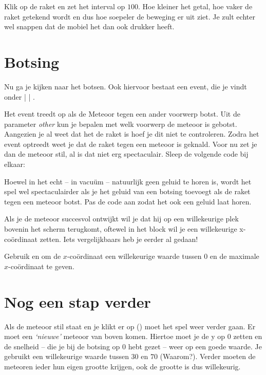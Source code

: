 \begin{opgave}
	\opgVraag
	Klik op de raket en zet het interval op $100$. Hoe kleiner het getal, hoe vaker de raket getekend wordt en dus hoe soepeler de beweging er uit ziet. Je zult echter wel snappen dat de mobiel het dan ook drukker heeft. 
\end{opgave}
\runOpTelefoon[-1.2in]{}

\section{Botsing}	
Nu ga je kijken naar het botsen. Ook hiervoor bestaat een event, die je vindt onder  |  | .

Het event treedt op als de Meteoor tegen een ander voorwerp botst. Uit de parameter \emph{other} kun je bepalen met welk voorwerp de meteoor is gebotst. Aangezien je al weet dat het de raket is hoef je dit niet te controleren. Zodra het event optreedt weet je dat de raket tegen een meteoor is geknald. Voor nu zet je dan de meteoor stil, al is dat niet erg spectaculair. Sleep de volgende code bij elkaar:


\runOpTelefoon{}
\begin{opgave}
   \opgVraag
	Hoewel in het echt -- in vacu\"um -- natuurlijk geen geluid te horen is, wordt het spel wel spectaculairder als je het geluid van een botsing toevoegt als de raket tegen een meteoor botst. Pas de code aan zodat het ook een geluid laat horen.
\end{opgave}

Als je de meteoor succesvol ontwijkt wil je dat hij op een willekeurige plek bovenin het scherm terugkomt, oftewel in het  block wil je een willekeurige x-co\"ordinaat zetten. Iets vergelijkbaars heb je eerder al gedaan!

\begin{opgave}
	\opgVraag
	Gebruik  en  om de $x$-co\"ordinaat een willekeurige waarde tussen 0 en de maximale $x$-co\"ordinaat te geven. 
\end{opgave}

\section{Nog een stap verder}
Als \runOpTelefoon{}de meteoor stil staat en je klikt er op () moet het spel weer verder gaan. Er moet een \emph{`nieuwe'} meteoor van boven komen. Hiertoe moet je de y op $0$ zetten en de snelheid -- die je bij de botsing op $0$  hebt gezet -- weer op een goede waarde. Je gebruikt een willekeurige waarde tussen $30$ en $70$ (Waarom?). Verder moeten de meteoren ieder hun eigen grootte krijgen, ook de grootte is dus willekeurig.

